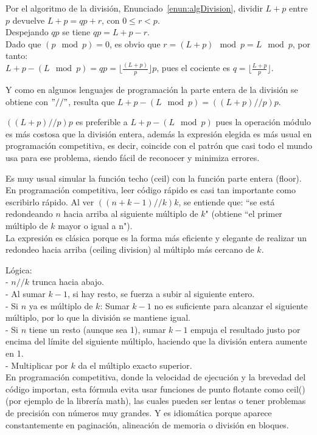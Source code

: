 Por el algoritmo de la división, Enunciado~\ref{enun:algDivision}, dividir $L+p$ entre $p$ devuelve $L + p = qp + r$, con $0 \leq r < p$.\\
Despejando $qp$ se tiene $qp = L + p - r$.\\
Dado que $(p \mod p) = 0$, es obvio que $r = (L + p) \mod p = L \mod p$, por tanto:\\
$L + p - (L \mod p) = qp = \lfloor \frac{(L + p)}{p} \rfloor p$, pues el cociente es $q = \lfloor \frac{L+p}{p} \rfloor$.

Y como en algunos lenguajes de programación la parte entera de la división se obtiene con $"//"$, resulta que $L + p - (L \mod p) = ((L + p) // p) p$.
 
$((L + p) // p) p$ es preferible a $L+p-(L \mod p)$ pues la operación módulo es más costosa que la división entera, además la expresión elegida es más usual en programación competitiva, es decir, coincide con el patrón que casi todo el mundo usa para ese problema, siendo fácil de reconocer y minimiza errores.

Es muy usual simular la función techo (ceil) con la función parte entera (floor).\\
En programación competitiva, leer código rápido es casi tan importante como escribirlo rápido. Al ver $((n + k - 1) // k) k$, se entiende que: “se está redondeando $n$ hacia arriba al siguiente múltiplo de $k$" (obtiene “el primer múltiplo de $k$ mayor o igual a n"). \\
La expresión es clásica porque es la forma más eficiente y elegante de realizar un redondeo hacia arriba (ceiling division) al múltiplo más cercano de $k$.

Lógica:\\
- $n // k$ trunca hacia abajo.\\
- Al sumar $k - 1$, si hay resto, se fuerza a subir al siguiente entero.\\
- Si $n$ ya es múltiplo de $k$: Sumar $k-1$ no es suficiente para alcanzar el siguiente múltiplo, por lo que la división se mantiene igual.\\
- Si $n$ tiene un resto (aunque sea 1), sumar $k-1$ empuja el resultado justo por encima del límite del siguiente múltiplo, haciendo que la división entera aumente en 1.\\
- Multiplicar por $k$ da el múltiplo exacto superior.\\
En programación competitiva, donde la velocidad de ejecución y la brevedad del código importan, esta fórmula evita usar funciones de punto flotante como ceil() (por ejemplo de la librería math), las cuales pueden ser lentas o tener problemas de precisión con números muy grandes. Y es idiomática porque aparece constantemente en paginación, alineación de memoria o división en bloques.\\
 
